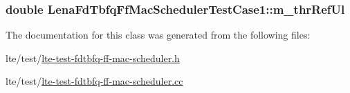 \subsubsection[{\texorpdfstring{m\+\_\+thr\+Ref\+Ul}{m_thrRefUl}}]{\setlength{\rightskip}{0pt plus 5cm}double Lena\+Fd\+Tbfq\+Ff\+Mac\+Scheduler\+Test\+Case1\+::m\+\_\+thr\+Ref\+Ul\hspace{0.3cm}{\ttfamily [private]}}\hypertarget{classLenaFdTbfqFfMacSchedulerTestCase1_aa2ca4cca69b2300d7747b77cae450e8a}{}\label{classLenaFdTbfqFfMacSchedulerTestCase1_aa2ca4cca69b2300d7747b77cae450e8a}


The documentation for this class was generated from the following files\+:\begin{DoxyCompactItemize}
\item 
lte/test/\hyperlink{lte-test-fdtbfq-ff-mac-scheduler_8h}{lte-\/test-\/fdtbfq-\/ff-\/mac-\/scheduler.\+h}\item 
lte/test/\hyperlink{lte-test-fdtbfq-ff-mac-scheduler_8cc}{lte-\/test-\/fdtbfq-\/ff-\/mac-\/scheduler.\+cc}\end{DoxyCompactItemize}
